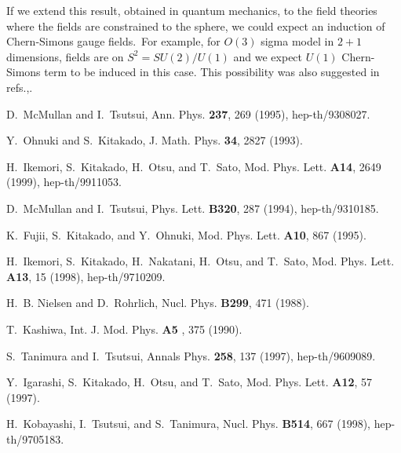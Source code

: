 \documentclass[12pt,a4paper]{article}
\begin{document}
If we extend this result, obtained in quantum mechanics, to the field
theories where the fields are constrained to the sphere, we could expect an
induction of Chern-Simons gauge fields.\ For example, for $O(3)$ sigma model
in $2+1$ dimensions, fields are on $S^{2}=SU(2)/U(1)$ and we expect $U(1)$
Chern-Simons term to be induced in this case. This possibility was also
suggested in refs.\cite{Igarashi:1997tk},\cite{Kobayashi:1997rf}.

%
%

\begin{thebibliography}{99}
  D.~McMullan and I.~Tsutsui, \newblock Ann. Phys. 
\textbf{237}, 269 (1995), hep-th/9308027.

  Y.~Ohnuki and S.~Kitakado, \newblock J. Math. Phys. 
\textbf{34}, 2827 (1993).

  H.~Ikemori, S.~Kitakado, H.~Otsu, and T.~Sato, %
\newblock Mod. Phys. Lett. \textbf{A14}, 2649 (1999), hep-th/9911053.

  D.~McMullan and I.~Tsutsui, \newblock Phys. Lett. 
\textbf{B320}, 287 (1994), hep-th/9310185.

  K.~Fujii, S.~Kitakado, and Y.~Ohnuki, \newblock Mod.
Phys. Lett. \textbf{A10}, 867 (1995).

  H.~Ikemori, S.~Kitakado, H.~Nakatani, H.~Otsu, and
T.~Sato, \newblock Mod. Phys. Lett. \textbf{A13}, 15 (1998), hep-th/9710209.

  H.~B. Nielsen and D.~Rohrlich, \newblock Nucl.
Phys. \textbf{B299}, 471 (1988).

  T.~Kashiwa, \newblock Int. J. Mod. Phys. \textbf{A5%
}, 375 (1990).

  S.~Tanimura and I.~Tsutsui, \newblock Annals
Phys. \textbf{258}, 137 (1997), hep-th/9609089.

  Y.~Igarashi, S.~Kitakado, H.~Otsu, and T.~Sato, %
\newblock Mod. Phys. Lett. \textbf{A12}, 57 (1997).

  H.~Kobayashi, I.~Tsutsui, and S.~Tanimura, %
\newblock Nucl. Phys. \textbf{B514}, 667 (1998), hep-th/9705183.
\end{thebibliography}
\end{document}
